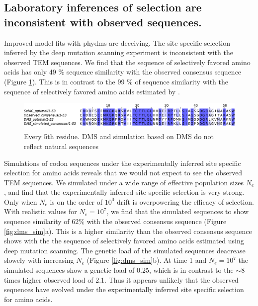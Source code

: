 \documentclass[12pt]{article}
\begin{document}
\subsection*{Laboratory inferences of selection are inconsistent with observed sequences.}
Improved model fits with phydms are deceiving.
The site specific selection inferred by the deep mutation scanning experiment is inconsistent with the observed TEM sequences.
We find that the sequence of selectively favored amino acids has only 49 \% sequence similarity with the observed consensus sequence (Figure \ref{fig:sim_seqs_cons}).
This is in contrast to the 99 \% of sequence similarity with the sequence of selectively favored amino acids estimated by \selac.

\begin{figure}[H]
     \centering
	\includegraphics[width=\textwidth]{img/seq_simil_short.pdf}
	\caption{Every 5th residue. DMS and simulation based on DMS do not reflect natural sequences}
	\label{fig:sim_seqs_cons}
\end{figure}

Simulations of codon sequences under the experimentally inferred site specific selection for amino acids reveals that we would not expect to see the observed TEM sequences.
We simulated under a wide range of effective population sizes $N_e$, and find that the experimentally inferred site specific selection is very strong.
Only when $N_e$ is on the order of $10^0$ drift is overpowering the efficacy of selection.
With realistic values for $N_e = 10^7$, we find that the simulated sequences to show sequence similarity of $62 \%$ with the observed consensus sequence (Figure \ref{fig:dms_sim}a).
This is a higher similarity than the observed consensus sequence shows with the the sequence of selectively favored amino acids estimated using deep mutation scanning.
The genetic load of the simulated sequences deacrease slowely with increasing $N_e$ (Figure \ref{fig:dms_sim}b).
At time 1 and $N_e = 10^7$ the simulated sequences show a genetic load of 0.25, which is in contrast to the $\sim 8$ times higher observed load of 2.1.
Thus it appears unlikely that the observed sequences have evolved under the experimentally inferred site specific selection for amino acids.
\end{document}
